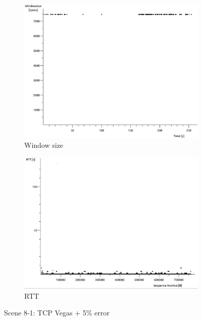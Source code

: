 \documentclass[conference,a4paper]{../../sty/IEEEtran}
\begin{document}
\begin{figure}
\begin{subfigure}[b]{0.2\textwidth}
  \includegraphics[width=\textwidth]{s8-1_wsize}
  \caption{Window size}
 \end{subfigure}
 \begin{subfigure}[b]{0.2\textwidth}
  \includegraphics[width=\textwidth]{s8-1_rtt}
  \caption{RTT}
 \end{subfigure}
 \caption{Scene 8-1: TCP Vegas + 5\% error}
\end{figure}
\end{document}
